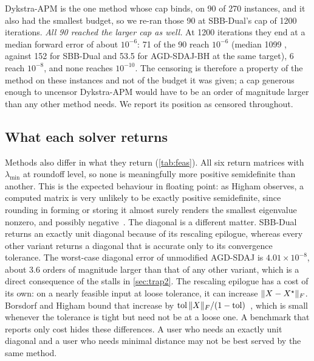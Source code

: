 Dykstra-APM is the one method whose cap binds, on 90 of 270 instances, and it
also had the smallest budget, so we re-ran those 90 at SBB-Dual's cap of 1200
iterations. \emph{All 90 reached the larger cap as well.} At 1200 iterations
they end at a median forward error of about $10^{-6}$: 71 of the 90 reach
$10^{-6}$ (median 1099 \EVDs, against 152 for SBB-Dual and 53.5 for
AGD-SDAJ-BH at the same target), 6 reach $10^{-8}$, and none reaches
$10^{-10}$. The censoring is therefore a property of the method on these
instances and not of the budget it was given; a cap generous enough to
uncensor Dykstra-APM would have to be an order of magnitude larger than any
other method needs. We report its position as censored throughout.



\subsection{What each solver returns}\label{sec:returned}
Methods also differ in what they return (\cref{tab:feas}). All six return
matrices with $\lambda_{\min}$ at roundoff level, so none is meaningfully more
positive semidefinite than another. This is the expected behaviour in floating
point: as Higham observes, a computed matrix is very unlikely to be exactly
positive semidefinite, since rounding in forming or storing it almost surely
renders the smallest eigenvalue nonzero, and possibly
negative~\cite[\S10.3.2]{higham2002accuracy}. The diagonal is a different matter.
SBB-Dual returns an exactly unit diagonal because of its rescaling epilogue,
whereas every other variant returns a diagonal that is accurate only to its
convergence tolerance. The worst-case diagonal error of unmodified AGD-SDAJ
is $4.01\times10^{-8}$, about 3.6 orders of magnitude larger than that of any
other variant, which is a direct consequence of the stalls in
\cref{sec:trap2}. The rescaling epilogue has a cost of its own: on a
nearly feasible input at loose tolerance, it can increase $\lVert X-X^\star\rVert_F$.
Borsdorf and Higham bound that increase by
$\mathrm{tol}\,\lVert X\rVert_F/(1-\mathrm{tol})$~\cite[Lem.~3.2]{borsdorf2010preconditioned},
which is small whenever the tolerance is tight but need not be at a loose
one.
A benchmark that reports only cost hides these differences. A user who needs
an exactly unit diagonal and a user who needs minimal distance may not be
best served by the same method.

